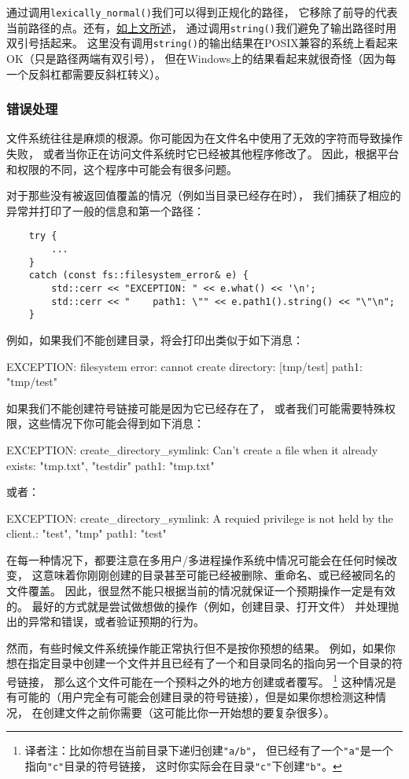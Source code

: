 通过调用\texttt{lexically\_normal()}我们可以得到正规化的路径，
它移除了前导的代表当前路径的点。还有，\hyperref[ch20.1.1.1]{如上文所述}，
通过调用\texttt{string()}我们避免了输出路径时用双引号括起来。
这里没有调用\texttt{string()}的输出结果在POSIX兼容的系统上看起来OK（只是路径两端有双引号），
但在Windows上的结果看起来就很奇怪（因为每一个反斜杠都需要反斜杠转义）。

\subsubsection{错误处理}\label{ch20.1.3.6}
文件系统往往是麻烦的根源。你可能因为在文件名中使用了无效的字符而导致操作失败，
或者当你正在访问文件系统时它已经被其他程序修改了。
因此，根据平台和权限的不同，这个程序中可能会有很多问题。

对于那些没有被返回值覆盖的情况（例如当目录已经存在时），
我们捕获了相应的异常并打印了一般的信息和第一个路径：
\begin{lstlisting}
    try {
        ...
    }
    catch (const fs::filesystem_error& e) {
        std::cerr << "EXCEPTION: " << e.what() << '\n';
        std::cerr << "    path1: \"" << e.path1().string() << "\"\n";
    }
\end{lstlisting}
例如，如果我们不能创建目录，将会打印出类似于如下消息：
\begin{blacklisting}
    EXCEPTION: filesystem error: cannot create directory: [tmp/test]
    path1: "tmp/test"
\end{blacklisting}
如果我们不能创建符号链接可能是因为它已经存在了，
或者我们可能需要特殊权限，这些情况下你可能会得到如下消息：\label{创建链接失败}
\begin{blacklisting}
    EXCEPTION: create_directory_symlink: Can't create a file when it already exists:
    "tmp\test\data.txt", "testdir"
    path1: "tmp\test\data.txt"
\end{blacklisting}
或者：
\begin{blacklisting}
    EXCEPTION: create_directory_symlink: A requied privilege is not held by the
    client.: "test", "tmp\slink"
    path1: "test"
\end{blacklisting}
在每一种情况下，都要注意在多用户/多进程操作系统中情况可能会在任何时候改变，
这意味着你刚刚创建的目录甚至可能已经被删除、重命名、或已经被同名的文件覆盖。
因此，很显然不能只根据当前的情况就保证一个预期操作一定是有效的。
最好的方式就是尝试做想做的操作（例如，创建目录、打开文件）
并处理抛出的异常和错误，或者验证预期的行为。

然而，有些时候文件系统操作能正常执行但不是按你预想的结果。
例如，如果你想在指定目录中创建一个文件并且已经有了一个和目录同名的指向另一个目录的符号链接，
那么这个文件可能在一个预料之外的地方创建或者覆写。
\footnote{译者注：比如你想在当前目录下递归创建\texttt{"a/b"}，
但已经有了一个\texttt{"a"}是一个指向\texttt{"c"}目录的符号链接，
这时你实际会在目录\texttt{"c"}下创建\texttt{"b"}。}
这种情况是有可能的（用户完全有可能会创建目录的符号链接），但是如果你想检测这种情况，
在创建文件之前你需要（这可能比你一开始想的要复杂很多）。

